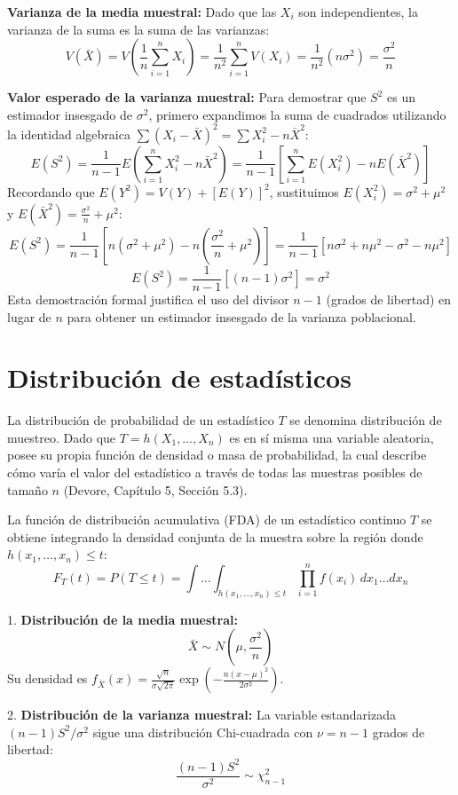 \textbf{Varianza de la media muestral:}
Dado que las $X_i$ son independientes, la varianza de la suma es la suma de las varianzas:
$$ V(\bar{X}) = V\left( \frac{1}{n} \sum_{i=1}^{n} X_i \right) = \frac{1}{n^2} \sum_{i=1}^{n} V(X_i) = \frac{1}{n^2} (n\sigma^2) = \frac{\sigma^2}{n} $$

\textbf{Valor esperado de la varianza muestral:}
Para demostrar que $S^2$ es un estimador insesgado de $\sigma^2$, primero expandimos la suma de cuadrados utilizando la identidad algebraica $\sum (X_i - \bar{X})^2 = \sum X_i^2 - n\bar{X}^2$:
$$ E(S^2) = \frac{1}{n-1} E\left( \sum_{i=1}^{n} X_i^2 - n\bar{X}^2 \right) = \frac{1}{n-1} \left[ \sum_{i=1}^{n} E(X_i^2) - nE(\bar{X}^2) \right] $$
Recordando que $E(Y^2) = V(Y) + [E(Y)]^2$, sustituimos $E(X_i^2) = \sigma^2 + \mu^2$ y $E(\bar{X}^2) = \frac{\sigma^2}{n} + \mu^2$:
$$ E(S^2) = \frac{1}{n-1} \left[ n(\sigma^2 + \mu^2) - n\left(\frac{\sigma^2}{n} + \mu^2\right) \right] = \frac{1}{n-1} \left[ n\sigma^2 + n\mu^2 - \sigma^2 - n\mu^2 \right] $$
$$ E(S^2) = \frac{1}{n-1} \left[ (n-1)\sigma^2 \right] = \sigma^2 $$
Esta demostración formal justifica el uso del divisor $n-1$ (grados de libertad) en lugar de $n$ para obtener un estimador insesgado de la varianza poblacional.

\section{Distribución de estadísticos}

La distribución de probabilidad de un estadístico $T$ se denomina distribución de muestreo. Dado que $T = h(X_1, \dots, X_n)$ es en sí misma una variable aleatoria, posee su propia función de densidad o masa de probabilidad, la cual describe cómo varía el valor del estadístico a través de todas las muestras posibles de tamaño $n$ (Devore, Capítulo 5, Sección 5.3).

La función de distribución acumulativa (FDA) de un estadístico continuo $T$ se obtiene integrando la densidad conjunta de la muestra sobre la región donde $h(x_1, \dots, x_n) \le t$:
$$ F_T(t) = P(T \le t) = \int \dots \int_{h(x_1, \dots, x_n) \le t} \prod_{i=1}^{n} f(x_i) \, dx_1 \dots dx_n $$

1. \textbf{Distribución de la media muestral:}
$$ \bar{X} \sim N\left(\mu, \frac{\sigma^2}{n}\right) $$
Su densidad es $f_{\bar{X}}(x) = \frac{\sqrt{n}}{\sigma\sqrt{2\pi}} \exp\left( -\frac{n(x-\mu)^2}{2\sigma^2} \right)$.

2. \textbf{Distribución de la varianza muestral:}
La variable estandarizada $(n-1)S^2/\sigma^2$ sigue una distribución Chi-cuadrada con $\nu = n-1$ grados de libertad:
$$ \frac{(n-1)S^2}{\sigma^2} \sim \chi^2_{n-1} $$

